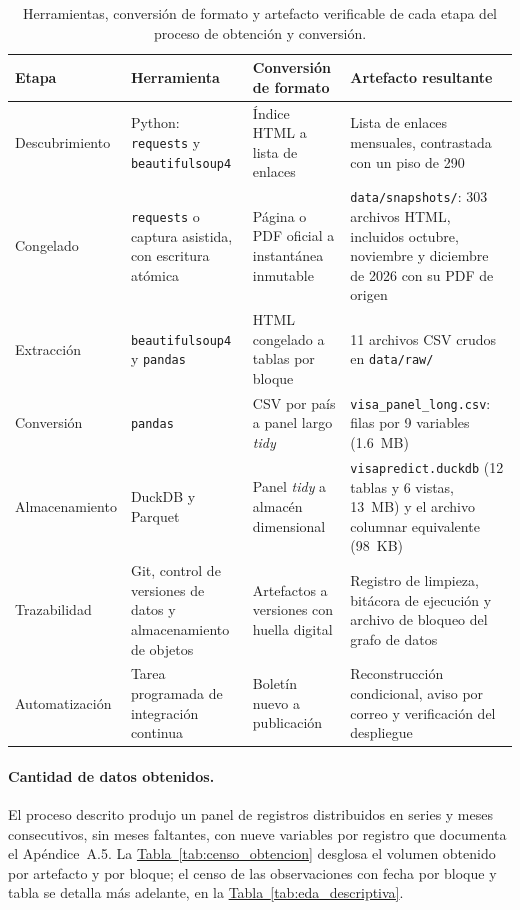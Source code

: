 \documentclass[12pt,letterpaper]{report}
\begin{document}
\begin{table}[htbp]
\centering
\footnotesize
\caption[Herramientas, formatos y artefactos por etapa]{Herramientas, conversión de formato y
artefacto verificable de cada etapa del proceso de obtención y conversión.}
\label{tab:herramientas}
\begin{tabular}{p{2.5cm}p{2.95cm}p{3.55cm}p{4.45cm}}
\toprule
\rowcolor{uacjblue!15}
\textbf{Etapa} & \textbf{Herramienta} & \textbf{Conversión de formato} & \textbf{Artefacto resultante} \\ \midrule
Descubrimiento & Python: \texttt{requests} y \texttt{beautifulsoup4} & Índice HTML a lista de enlaces & Lista de enlaces mensuales, contrastada con un piso de 290 \\
Congelado & \texttt{requests} o captura asistida, con escritura atómica & Página o PDF oficial a instantánea inmutable & \texttt{data/snapshots/}: 303 archivos HTML, incluidos octubre, noviembre y diciembre de 2026 con su PDF de origen \\
Extracción & \texttt{beautifulsoup4} y \texttt{pandas} & HTML congelado a tablas por bloque & 11 archivos CSV crudos en \texttt{data/raw/} \\
Conversión & \texttt{pandas} & CSV por país a panel largo \textit{tidy} & \texttt{visa\_panel\_long.csv}: \factNObsFmt{} filas por 9 variables (1.6~MB) \\
Almacenamiento & DuckDB y Parquet & Panel \textit{tidy} a almacén dimensional & \texttt{visapredict.duckdb} (12 tablas y 6 vistas, 13~MB) y el archivo columnar equivalente (98~KB) \\
Trazabilidad & Git, control de versiones de datos y almacenamiento de objetos & Artefactos a versiones con huella digital & Registro de limpieza, bitácora de ejecución y archivo de bloqueo del grafo de datos \\
Automatización & Tarea programada de integración continua & Boletín nuevo a publicación & Reconstrucción condicional, aviso por correo y verificación del despliegue \\
\bottomrule
\end{tabular}
\end{table}

\paragraph{Cantidad de datos obtenidos.} El proceso descrito produjo un panel de
\factNObsFmt{} registros distribuidos en \factNSeriesStructural{} series y \factNMonths{}
meses consecutivos, sin meses faltantes, con nueve variables por registro que documenta el
Apéndice~A.5. La \hyperref[tab:censo_obtencion]{Tabla~\ref*{tab:censo_obtencion}} desglosa el volumen obtenido por
artefacto y por bloque; el censo de las observaciones con fecha por bloque y tabla se
detalla más adelante, en la \hyperref[tab:eda_descriptiva]{Tabla~\ref*{tab:eda_descriptiva}}.
\end{document}
